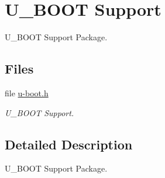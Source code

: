 \hypertarget{group__shared__uboot}{}\section{U\+\_\+\+B\+O\+OT Support}
\label{group__shared__uboot}


U\+\_\+\+B\+O\+OT Support Package.  


\subsection*{Files}
\begin{DoxyCompactItemize}
\item 
file \mbox{\hyperlink{u-boot_8h}{u-\/boot.\+h}}
\begin{DoxyCompactList}\small\item\em U\+\_\+\+B\+O\+OT Support. \end{DoxyCompactList}\end{DoxyCompactItemize}


\subsection{Detailed Description}
U\+\_\+\+B\+O\+OT Support Package. 

